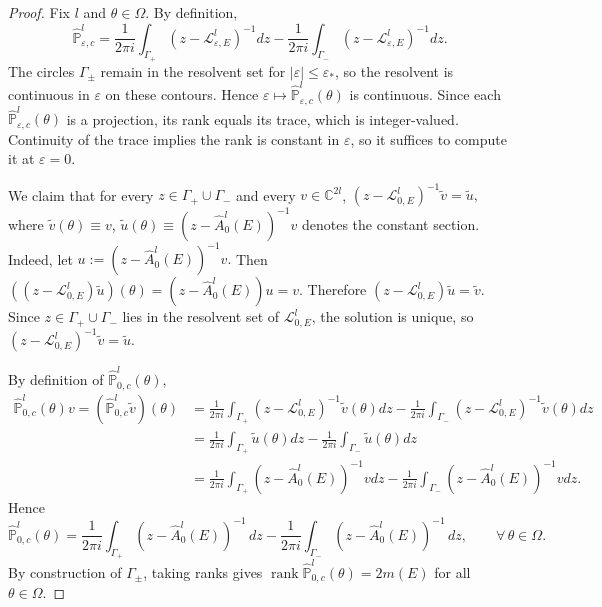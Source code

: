 \documentclass[reqno,11pt]{amsart}
\begin{document}
\begin{proof}
Fix $l$ and $\theta\in\Omega$. By definition,
$$
\widehat{\mathbb{P}}^{l}_{\varepsilon,c} = \frac{1}{2\pi i}\int_{\Gamma_+} (z-\mathcal{L}^{l}_{\varepsilon,E})^{-1} dz - \frac{1}{2\pi i}\int_{\Gamma_-} (z-\mathcal{L}^{l}_{\varepsilon,E})^{-1} dz.
$$
The circles $\Gamma_\pm$ remain in the resolvent set for $|\varepsilon|\le\varepsilon_\ast$, so the resolvent is continuous in $\varepsilon$ on these contours. Hence $\varepsilon\mapsto\widehat{\mathbb{P}}^{l}_{\varepsilon,c}(\theta)$ is continuous. Since each $\widehat{\mathbb{P}}^{l}_{\varepsilon,c}(\theta)$ is a projection, its rank equals its trace, which is integer-valued. Continuity of the trace implies the rank is constant in $\varepsilon$, so it suffices to compute it at $\varepsilon=0$.



We claim that for every $z\in \Gamma_+\cup\Gamma_-$ and every $v\in\mathbb C^{2l}$,
$
(z-\mathcal{L}^{l}_{0,E})^{-1}\widetilde v=\widetilde u,
$
where $\widetilde v(\theta)\equiv v$, $\widetilde u(\theta)\equiv
{(z-\widehat A_{0}^{l}(E))^{-1}v}$ denotes the constant section.
Indeed, let
$
u:=(z-\widehat A_{0}^{l}(E))^{-1}v.
$ Then
$
((z-\mathcal{L}^{l}_{0,E})\widetilde u)(\theta)=
(z-\widehat A_{0}^{l}(E))u=v.
$
Therefore
$
(z-\mathcal{L}^{l}_{0,E})\widetilde u=\widetilde v.
$
Since $z\in \Gamma_+\cup\Gamma_-$ lies in the resolvent set of $\mathcal{L}^{l}_{0,E}$,
the solution is unique, so
$
(z-\mathcal{L}^{l}_{0,E})^{-1}\widetilde v=
\widetilde u.
$

By definition of $\widehat{\mathbb{P}}^{l}_{0,c}(\theta)$,
\begin{align*}
\widehat{\mathbb{P}}^{l}_{0,c}(\theta)v=(\widehat{\mathbb{P}}^{l}_{0,c}\widetilde v)(\theta)
&=
\frac{1}{2\pi i}\int_{\Gamma_+}(z-\mathcal{L}^{l}_{0,E})^{-1}\widetilde v(\theta)dz-
\frac{1}{2\pi i}\int_{\Gamma_-}(z-\mathcal{L}^{l}_{0,E})^{-1}\widetilde v(\theta)dz \\
&=\frac{1}{2\pi i}\int_{\Gamma_+}\widetilde u(\theta)dz-
\frac{1}{2\pi i}\int_{\Gamma_-}\widetilde u(\theta)dz\\
&=\frac{1}{2\pi i}\int_{\Gamma_+}(z- \widehat A_{0}^{l}(E))^{-1}vdz-
\frac{1}{2\pi i}\int_{\Gamma_-}(z- \widehat A_{0}^{l}(E))^{-1}vdz.
\end{align*}
Hence
$$
\widehat{\mathbb{P}}^{l}_{0,c}(\theta)
=\frac{1}{2\pi i}\int_{\Gamma_+}(z-\widehat A_0^l(E))^{-1}\,dz
-\frac{1}{2\pi i}\int_{\Gamma_-}(z-\widehat A_0^l(E))^{-1}\,dz,
\qquad \forall\,\theta\in\Omega.
$$
By construction of  $\Gamma_{\pm}$, taking ranks gives
$\operatorname{rank}\widehat{\mathbb{P}}^{l}_{0,c}(\theta)=2m(E)$ for all $\theta\in\Omega.$
\end{proof}
\end{document}
